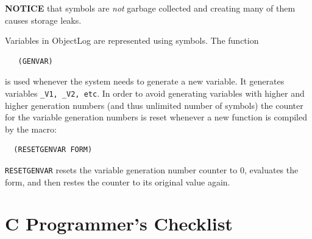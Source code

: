 {\bf NOTICE} that symbols are {\em not} garbage collected
and creating many of them causes storage leaks.

Variables in ObjectLog are represented using symbols.  The function
\begin{verbatim}
   (GENVAR)
\end{verbatim}
is used whenever the system needs to generate a new variable. It
generates variables {\tt \_V1, \_V2, etc}. In order to avoid
generating variables with higher and higher generation numbers (and
thus unlimited number of symbols) the counter for the variable
generation numbers is reset whenever a new function is compiled by the
macro:
\begin{verbatim}
  (RESETGENVAR FORM)
\end{verbatim}
{\tt RESETGENVAR} resets the variable generation number counter to 0,
evaluates the form, and then restes the counter to its original value
again.
\section{C Programmer's Checklist}
\label{checklist}


